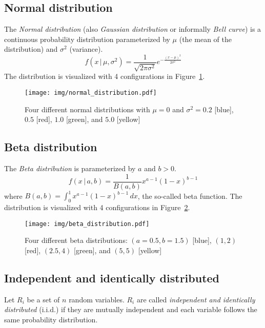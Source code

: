 \subsection{Normal distribution}
\label{sec:bp-norm-dist}
%
The \emph{Normal distribution} (also \emph{Gaussian distribution} or informally \emph{Bell curve}) is a continuous
probability distribution parameterized by $\mu$ (the mean of the distribution) and $\sigma^2$ (variance).
\[ f(x \,|\, \mu, \sigma^2) = \frac{1}{\sqrt{2 \pi \sigma^2}} e^{-\frac{(x - \mu)^2}{2 \sigma^2}} \]
The distribution is visualized with 4 configurations in Figure~\ref{fig:norm-dist}.

\begin{figure}[p]
  \begin{center}
    \texttt{[image: img/normal\_distribution.pdf]}
    \caption{
      Four different normal distributions with $\mu=0$ and $\sigma^2 = 0.2$ [blue],
      $0.5$ [red], $1.0$ [green], and $5.0$ [yellow]
    }
    \label{fig:norm-dist}
  \end{center}
\end{figure}

\subsection{Beta distribution}
\label{sec:beta-dist}
%
The \emph{Beta distribution} is parameterized by $a$ and $b > 0$.
\[ f(x \,|\, a, b) = \frac{1}{B(a, b)} x^{a - 1} (1 - x)^{b-1} \]
where $B(a, b) = \int_0^1 x^{a-1} (1 - x)^{b-1} \, dx$, the so-called beta function.
The distribution is visualized with 4 configurations in Figure~\ref{fig:beta-dist}.

\begin{figure}[p]
  \begin{center}
    \texttt{[image: img/beta\_distribution.pdf]}
    \caption{
      Four different beta distributions:
      $(a=0.5, b=1.5)$ [blue], $(1, 2)$ [red], $(2.5, 4)$ [green], and $(5, 5)$ [yellow]
    }
    \label{fig:beta-dist}
  \end{center}
\end{figure}

\subsection{Independent and identically distributed}
\label{sec:bp-iid}
%
Let $R_i$ be a set of $n$ random variables. $R_i$ are called \emph{independent and
identically distributed} (i.i.d.) if they are mutually independent and each
variable follows the same probability distribution.

